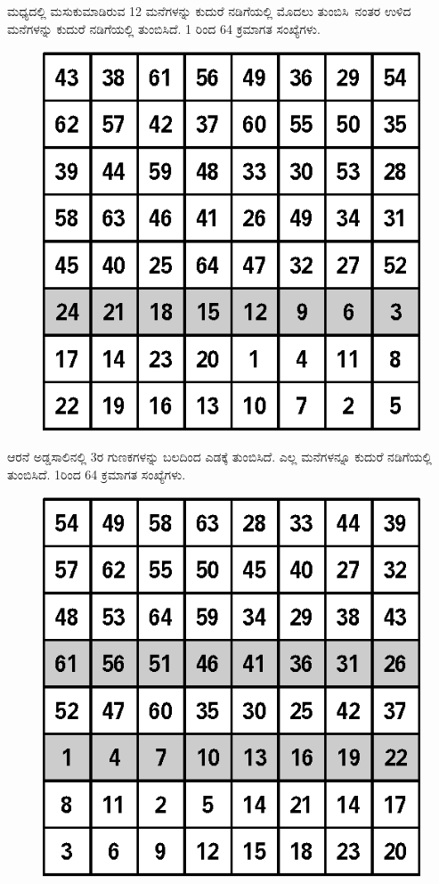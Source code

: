 ಮಧ್ಯದಲ್ಲಿ ಮಸುಕುಮಾಡಿರುವ 12 ಮನೆಗಳನ್ನು ಕುದುರೆ ನಡಿಗೆಯಲ್ಲಿ ಮೊದಲು \hbox{ತುಂಬಿಸಿ ನಂತರ} ಉಳಿದ ಮನೆಗಳನ್ನು ಕುದುರೆ ನಡಿಗೆಯಲ್ಲಿ ತುಂಬಿಸಿದೆ. 1 ರಿಂದ 64 ಕ್ರಮಾ\-ಗತ ಸಂಖ್ಯೆಗಳು.

\begin{figure}[H]
\includegraphics[scale=.95]{src/figures/chap6/fig6-15.eps}
\end{figure}
ಆರನೆ ಅಡ್ಡಸಾಲಿನಲ್ಲಿ 3ರ ಗುಣಕಗಳನ್ನು ಬಲದಿಂದ ಎಡಕ್ಕೆ ತುಂಬಿಸಿದೆ. ಎಲ್ಲ ಮನೆ\-ಗಳನ್ನೂ ಕುದುರೆ ನಡಿಗೆಯಲ್ಲಿ ತುಂಬಿಸಿದೆ. 1ರಿಂದ 64 ಕ್ರಮಾಗತ ಸಂಖ್ಯೆಗಳು.
\begin{figure}[H]
\includegraphics[scale=.95]{src/figures/chap6/fig6-16.eps}
\end{figure}
